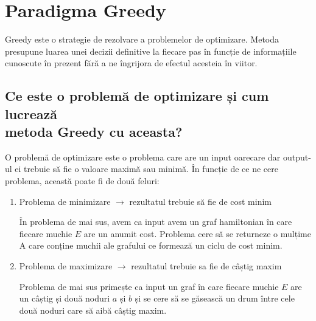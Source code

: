 \chapter{Paradigma Greedy}
Greedy este o strategie de rezolvare a problemelor de optimizare. Metoda presupune luarea unei decizii definitive la fiecare pas în funcție de informațiile cunoscute în prezent fără a ne îngrijora de efectul acesteia în viitor.


\section{Ce este o problemă de optimizare și cum lucrează \\ metoda Greedy cu aceasta?}

O problemă de optimizare este o problema care are un input oarecare dar output-ul ei trebuie să fie o valoare maximă sau minimă.
În funcție de ce ne cere problema, această poate fi de două feluri: 
\begin{enumerate}
	\item Problema de minimizare $\rightarrow$ rezultatul trebuie să fie de cost minim
	\par
	\par 
	\setlength{\parindent}{2em}
	În problema de mai sus, avem ca input avem un graf hamiltonian în care fiecare muchie $E$ are un anumit cost. Problema cere să se returneze o mulțime A care conține muchii ale grafului ce formează un ciclu de cost minim.
	\par
	\vspace{4cm}
	\setlength{\parindent}{0em}
	\item Problema de maximizare $\rightarrow$ rezultatul trebuie sa fie de câștig maxim
	\par
\par 
\setlength{\parindent}{2em}
Problema de mai sus primește ca input un graf în care fiecare muchie $E$ are un câștig și două noduri $a$ și $b$ și se cere să se găsească un drum între cele două noduri care să aibă câștig maxim.


\end{enumerate}

